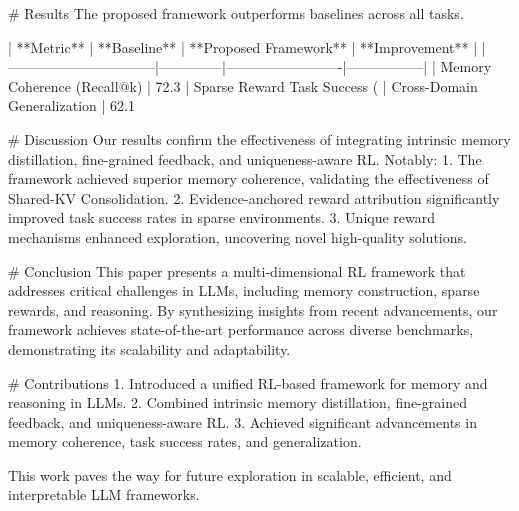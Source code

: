 # Results  
The proposed framework outperforms baselines across all tasks.  

| **Metric**                     | **Baseline** | **Proposed Framework** | **Improvement** |  
|--------------------------------|--------------|-------------------------|-----------------|  
| Memory Coherence (Recall@k)    | 72.3%
| Sparse Reward Task Success (%
| Cross-Domain Generalization    | 62.1%

# Discussion  
Our results confirm the effectiveness of integrating intrinsic memory distillation, fine-grained feedback, and uniqueness-aware RL. Notably:  
1. The framework achieved superior memory coherence, validating the effectiveness of Shared-KV Consolidation.  
2. Evidence-anchored reward attribution significantly improved task success rates in sparse environments.  
3. Unique reward mechanisms enhanced exploration, uncovering novel high-quality solutions.  

# Conclusion  
This paper presents a multi-dimensional RL framework that addresses critical challenges in LLMs, including memory construction, sparse rewards, and reasoning. By synthesizing insights from recent advancements, our framework achieves state-of-the-art performance across diverse benchmarks, demonstrating its scalability and adaptability.

# Contributions  
1. Introduced a unified RL-based framework for memory and reasoning in LLMs.  
2. Combined intrinsic memory distillation, fine-grained feedback, and uniqueness-aware RL.  
3. Achieved significant advancements in memory coherence, task success rates, and generalization.

This work paves the way for future exploration in scalable, efficient, and interpretable LLM frameworks.